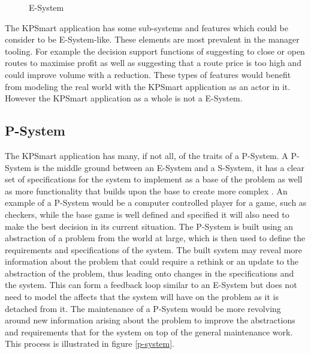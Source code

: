 \documentclass{style/CRPITStyle}
\renewcommand{\cite}{\citep}
\begin{document}
\vspace{.1in}

\begin{figure}[htb]
\caption{\protect\label{e-system}  E-System }
\end{figure}

The KPSmart application has some sub-systems and features which could
be consider to be E-System-like. These elements are most prevalent in
the manager tooling. For example the decision support functions of suggesting
to close or open routes to maximise profit as well as suggesting that a route 
price is too high and could improve volume with a reduction. These types of
features would benefit from modeling the real world with the KPSmart application
as an actor in it. However the KPSmart application as a whole is not a E-System.

\vspace{.1in}

\subsection{P-System}

The KPSmart application has many, if not all, of the traits of a
P-System. A P-System is the middle ground between an E-System and a
S-System, it has a clear set of specifications for the system to
implement as a base of the problem as well as more functionality that
builds upon the base to create more complex \cite{lehman:1980}. An 
example of a P-System would be a computer controlled player for a game,
such as checkers, while the base game is well defined and specified it
will also need to make the best decision in its current situation.
The P-System is built using an abstraction of a problem from the world
at large, which is then used to define the requirements and specifications 
of the system. The built system may reveal more information about the problem
that could require a rethink or an update to the abstraction of the problem,
thus leading onto changes in the specifications and the system. This can form
a feedback loop similar to an E-System but does not need to model the affects
that the system will have on the problem as it is detached from it.
The maintenance of a P-System would be more revolving around new information
arising about the problem to improve the abstractions and requirements that for
the system on top of the general maintenance work.
This process is illustrated in figure \ref{p-system}.
\end{document}
